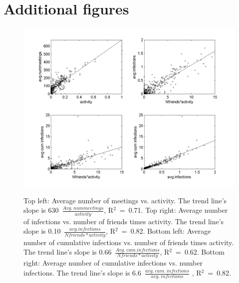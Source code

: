 \begin{thebibliography}{9}



	


\end{thebibliography}






\section{Additional figures}

\begin{figure}
\begin{center}
\includegraphics[width=16cm]{ImportantCorrelations}

\label{ImportantCorrelations}
\caption{Top left: Average number of meetings vs. activity. The trend line's slope is 630~$\frac{Avg.~nummeetings}{activity}$, R$^2$~=~0.71. Top right: Average number of infections vs. number of friends times activity. The trend line's slope is 0.10~$\frac{avg. infections}{Nfriends*activity}$, R$^2$~=~0.82. Bottom left: Average number of cumulative infections vs. number of friends times activity. The trend line's slope is 0.66~$\frac{Avg.~cum. infections}{Nfriends*activity}$, R$^2$~=~0.62. Bottom right: Average number of cumulative infections vs. number infections. The trend line's slope is  6.6~$\frac{avg.~cum.~infections}{avg.~infections}$ , R$^2$~=~0.82.}
\end{center}
\end{figure}

